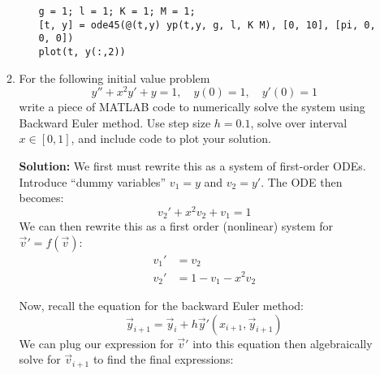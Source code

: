 \documentclass[letterpaper, fontsize=10pt]{scrartcl} %
\numberwithin{equation}{section} %
\numberwithin{figure}{section} %
\numberwithin{table}{section} %
\begin{document}
\begin{enumerate}
\begin{enumerate}
\begin{enumerate}[label=(\roman*)]
\begin{lstlisting}
g = 1; l = 1; K = 1; M = 1;
[t, y] = ode45(@(t,y) yp(t,y, g, l, K M), [0, 10], [pi, 0, 0, 0])
plot(t, y(:,2))
\end{lstlisting}

\end{enumerate}


\item For the following initial value problem
\[ y'' + x^2y' + y = 1,\quad y(0) = 1, \quad y'(0) = 1 \]
write a piece of MATLAB code to numerically solve the system using Backward Euler method. Use step size $h = 0.1$, solve over interval $x \in [0,1]$, and include code to plot your solution. 

\par\textbf{Solution:}
We first must rewrite this as a system of first-order ODEs. Introduce ``dummy variables'' $v_1 = y$ and $v_2 = y'$. The ODE then becomes:
\[ v_2' + x^2 v_2 + v_1 = 1 \]
We can then rewrite this as a first order (nonlinear) system for $\vec v' = f(\vec v)$:
\begin{align*}
v_1' &= v_2\\
v_2' &= 1 - v_1 - x^2 v_2
\end{align*}

Now, recall the equation for the backward Euler method:
\[ \vec y_{i+1} = \vec y_i + h \vec y'(x_{i+1}, \vec y_{i+1}) \]
We can plug our expression for $\vec v'$ into this equation then algebraically solve for $\vec v_{i+1}$ to find the final expressions:


\end{enumerate}
\end{enumerate}
\end{document}
